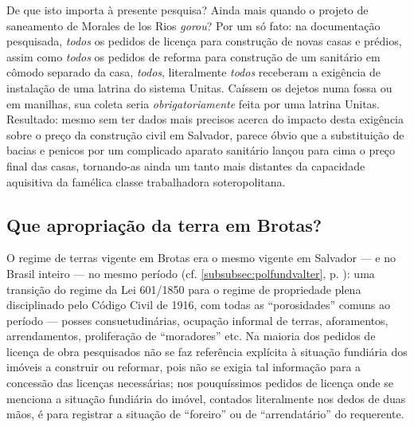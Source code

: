 De que isto importa à presente pesquisa? Ainda mais quando o projeto de saneamento de Morales de los Rios \textit{gorou}? Por um só fato: na documentação pesquisada, \textit{todos} os pedidos de licença para construção de novas casas e prédios, assim como \textit{todos} os pedidos de reforma para construção de um sanitário em cômodo separado da casa, \textit{todos}, literalmente \textit{todos} receberam a exigência de instalação de uma latrina do sistema Unitas. Caíssem os dejetos numa fossa ou em manilhas, sua coleta seria \textit{obrigatoriamente} feita por uma latrina Unitas. Resultado: mesmo sem ter dados mais precisos acerca do impacto desta exigência sobre o preço da construção civil em Salvador, parece óbvio que a substituição de bacias e penicos por um complicado aparato sanitário lançou para cima o preço final das casas, tornando-as ainda um tanto mais distantes da capacidade aquisitiva da famélica classe trabalhadora soteropolitana.

\subsection{Que apropriação da terra em Brotas?}\label{subsec:apropribrotas}

O regime de terras vigente em Brotas era o mesmo vigente em Salvador --- e no Brasil inteiro --- no mesmo período (cf. \autoref{subsubsec:polfundvalter}, p. \pageref{subsubsec:polfundvalter}): uma transição do regime da Lei 601/1850 para o regime de propriedade plena disciplinado pelo Código Civil de 1916, com todas as ``porosidades'' comuns ao período --- posses consuetudinárias, ocupação informal de terras, aforamentos, arrendamentos, proliferação de ``moradores'' etc. Na maioria dos pedidos de licença de obra pesquisados não se faz referência explícita à situação fundiária dos imóveis a construir ou reformar, pois não se exigia tal informação para a concessão das licenças necessárias; nos pouquíssimos pedidos de licença onde se menciona a situação fundiária do imóvel, contados literalmente nos dedos de duas mãos, é para registrar a situação de ``foreiro'' ou de ``arrendatário'' do requerente. 

